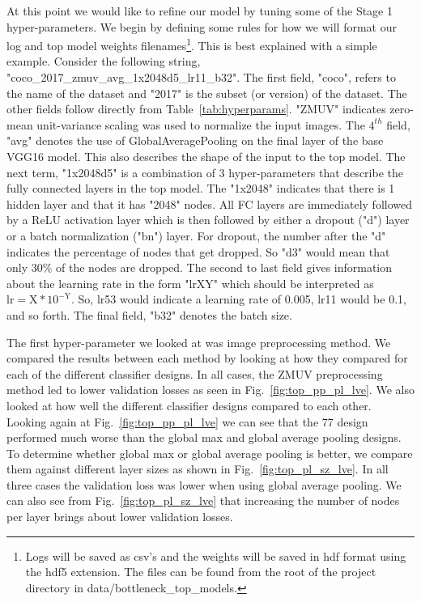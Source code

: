 \documentclass[12pt,journal,compsoc]{IEEEtran}
\begin{document}
At this point we would like to refine our model by tuning some of the Stage 1 hyper-parameters.  We begin by defining some rules for how we will format our log and top model weights filenames\footnote{Logs will be saved as csv's and the weights will be saved in hdf format using the hdf5 extension. The files can be found from the root of the project directory in data/bottleneck\_top\_models.}. This is best explained with a simple example.  Consider the following string, "coco\_2017\_zmuv\_avg\_1x2048d5\_lr11\_b32".  The first field, "coco", refers to the name of the dataset and "2017" is the subset (or version) of the dataset. The other fields follow directly from Table~\ref{tab:hyperparams}. "ZMUV" indicates zero-mean unit-variance scaling was used to normalize the input images.  The $4^{th}$ field, "avg" denotes the use of GlobalAveragePooling on the final layer of the base VGG16 model.  This also describes the shape of the input to the top model.  The next term, "1x2048d5" is a combination of 3 hyper-parameters that describe the fully connected layers in the top model.  The "1x2048" indicates that there is 1 hidden layer and that it has "2048" nodes.  All FC layers are immediately followed by a ReLU activation layer which is then followed by either a dropout ("d") layer or a batch normalization ("bn") layer.  For dropout, the number after the "d" indicates the percentage of nodes that get dropped.  So "d3" would mean that only 30\% of the nodes are dropped.  The second to last field gives information about the learning rate in the form "lrXY" which should be interpreted as $\mathrm{lr = X * 10^{-Y}}$.  So, lr53 would indicate a learning rate of 0.005, lr11 would be 0.1, and so forth. The final field, "b32" denotes the batch size.

The first hyper-parameter we looked at was image preprocessing method.  We compared the results between each method by looking at how they compared for each of the different classifier designs.  In all cases, the ZMUV preprocessing method led to lower validation losses as seen in Fig.~\ref{fig:top_pp_pl_lve}.  We also looked at how well the different classifier designs compared to each other.  Looking again at Fig.~\ref{fig:top_pp_pl_lve} we can see that the 77 design performed much worse than the global max and global average pooling designs. To determine whether global max or global average pooling is better, we compare them against different layer sizes as shown in Fig.~\ref{fig:top_pl_sz_lve}.  In all three cases the validation loss was lower when using global average pooling.  We can also see from Fig.~\ref{fig:top_pl_sz_lve} that increasing the number of nodes per layer brings about lower validation losses. 
\end{document}
